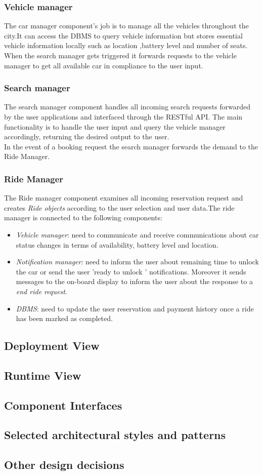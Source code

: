 \subsubsection{Vehicle manager}
The car manager component's job is to manage all the vehicles throughout the city.It can access the DBMS to query vehicle information but stores essential vehicle information locally such as location ,battery level and number of seats. When the search manager gets triggered it forwards requests to the vehicle manager to get all 
available car in compliance to the user input.
\subsubsection{Search manager}
The search manager component handles all incoming search requests forwarded by the user applications and interfaced through the RESTful API. The main functionality is to handle the user input and query the vehicle manager accordingly, returning the desired output to the user.\\In the event of a booking request the search manager forwards the demand to the Ride Manager.
\subsubsection{Ride Manager}
The Ride manager component examines all incoming reservation request and creates \textit{Ride objects} according to the user selection and user data.The ride manager
is connected to the following components:
\begin{itemize}
\item \textit{Vehicle manager}: need to communicate and receive communications about car status changes in terms of availability, battery level and location.
\item \textit{Notification manager}: need to inform the user about remaining time to unlock the car or send the user 'ready to unlock ' notifications. Moreover it sends messages to the on-board display to inform the user about the response to a \textit{end ride request}.
\item \textit{DBMS}: need to update the user reservation and payment history once a ride has been marked as completed.  
\end{itemize}
\subsection{Deployment View}
\newpage
\subsection{Runtime View}
\newpage
\subsection{Component Interfaces}
\newpage
\subsection{Selected architectural styles and patterns}
\newpage
\subsection{Other design decisions}
\newpage